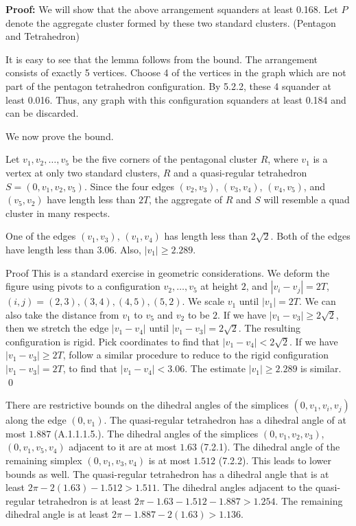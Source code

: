{\bf Proof:} We will show that the above arrangement squanders at least
0.168.  Let $P$ denote the aggregate cluster formed by these two standard
clusters. (Pentagon and Tetrahedron)

It is easy to see that the lemma follows from the bound.  The arrangement consists of exactly 5 vertices.  Choose 4 of the vertices in the graph which are not part of the pentagon tetrahedron configuration.  By 5.2.2, these 4 squander at least 0.016.  Thus, any graph with this configuration squanders at least 0.184 and can be discarded.

We now prove the bound.  

Let $v_1,v_2,\ldots,v_5$
be the five corners of the pentagonal cluster $R$, where $v_1$ is a
vertex at only two standard clusters, $R$ and a quasi-regular tetrahedron
$S = (0,v_1,v_2,v_5)$.   Since the four edges $(v_2,v_3)$, $(v_3,v_4)$,
$(v_4,v_5)$, and $(v_5,v_2)$ have length less than $2T$, the
aggregate of 
$R$ and $S$ will resemble a quad cluster in many respects.

  One of the edges $(v_1,v_3)$, $(v_1,v_4)$ has
length less than $2\sqrt{2}$.  Both of the edges have length less
than $3.06$. Also, $|v_1|\ge2.289$.
\endproclaim

\demo
{Proof}
This is a standard exercise in geometric considerations.
We deform the figure using pivots to a configuration $v_2,\ldots,v_5$
at height $2$, and $|v_i-v_j|=2T$, $(i,j)=(2,3),(3,4),(4,5),(5,2)$.
We scale $v_1$ until $|v_1|=2T$.
We can also take the distance from $v_1$ to $v_5$ and $v_2$ to be
$2$.  If we have $|v_1-v_3|\ge 2\sqrt{2}$, then we stretch
the edge $|v_1-v_4|$ until $|v_1-v_3|=2\sqrt{2}$.  The resulting
configuration is rigid.  Pick coordinates to find that $|v_1-v_4|<2\sqrt{2}$.
If we have $|v_1-v_3|\ge 2T$, follow a similar procedure to
reduce to the rigid configuration $|v_1-v_3|=2T$, to find that
$|v_1-v_4|<3.06$.
The estimate $|v_1|\ge2.289$ is similar.
\qed
\enddemo

There are restrictive bounds on the dihedral angles of the
simplices $(0,v_1,v_i,v_j)$ along the edge $(0,v_1)$.  
The quasi-regular tetrahedron has a
dihedral angle of at most $1.887$ (A.1.1.1.5.).  The dihedral angles
of the simplices $(0,v_1,v_2,v_3)$, $(0,v_1,v_5,v_4)$
adjacent to it are at most $1.63$ (7.2.1).
The dihedral angle of the remaining simplex $(0,v_1,v_3,v_4)$ is at
most $1.512$ (7.2.2).   This leads to lower bounds as well.
The quasi-regular tetrahedron has a dihedral angle that is at least
$2\pi - 2(1.63)-1.512 > 1.511$.  The dihedral angles adjacent to the
quasi-regular tetrahedron is at least $2\pi- 1.63-1.512-1.887> 1.254$.
The remaining dihedral angle is at least $2\pi-1.887-2(1.63) > 1.136$.

